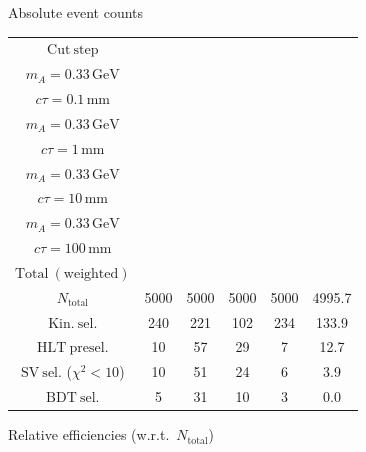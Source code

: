 \documentclass[10pt,a4paper]{article}
\renewcommand{\arraystretch}{1.4}
\begin{document}
{\footnotesize\setlength{\tabcolsep}{4pt}\renewcommand{\arraystretch}{1.05}%
\vspace{12pt}

Absolute event counts

\begin{tabular}{cccccc}
\toprule
$\mathrm{Cut\ step}$ & \shortstack{$m_{\pi}=1\,\mathrm{GeV}$\\$m_{A}=0.33\,\mathrm{GeV}$\\$c\tau=0.1\,\mathrm{mm}$} & \shortstack{$m_{\pi}=1\,\mathrm{GeV}$\\$m_{A}=0.33\,\mathrm{GeV}$\\$c\tau=1\,\mathrm{mm}$} & \shortstack{$m_{\pi}=1\,\mathrm{GeV}$\\$m_{A}=0.33\,\mathrm{GeV}$\\$c\tau=10\,\mathrm{mm}$} & \shortstack{$m_{\pi}=1\,\mathrm{GeV}$\\$m_{A}=0.33\,\mathrm{GeV}$\\$c\tau=100\,\mathrm{mm}$} & \shortstack{$\mathrm{QCD}$\\$\mathrm{Total\ (weighted)}$} \\
\midrule
$N_{\mathrm{total}}$ & 5000 & 5000 & 5000 & 5000 & 4995.7\\
$\mathrm{Kin.\ sel.}$ & 240 & 221 & 102 & 234 & 133.9\\
$\mathrm{HLT\ presel.}$ & 10 & 57 & 29 & 7 & 12.7\\
$\mathrm{SV\ sel.}$ ($\chi^2{<}10$) & 10 & 51 & 24 & 6 & 3.9\\
$\mathrm{BDT\ sel.}$ & 5 & 31 & 10 & 3 & 0.0\\
\bottomrule
\end{tabular}

\vspace{18pt}

Relative efficiencies (w.r.t.\ $N_{\mathrm{total}}$)

}
\end{document}

